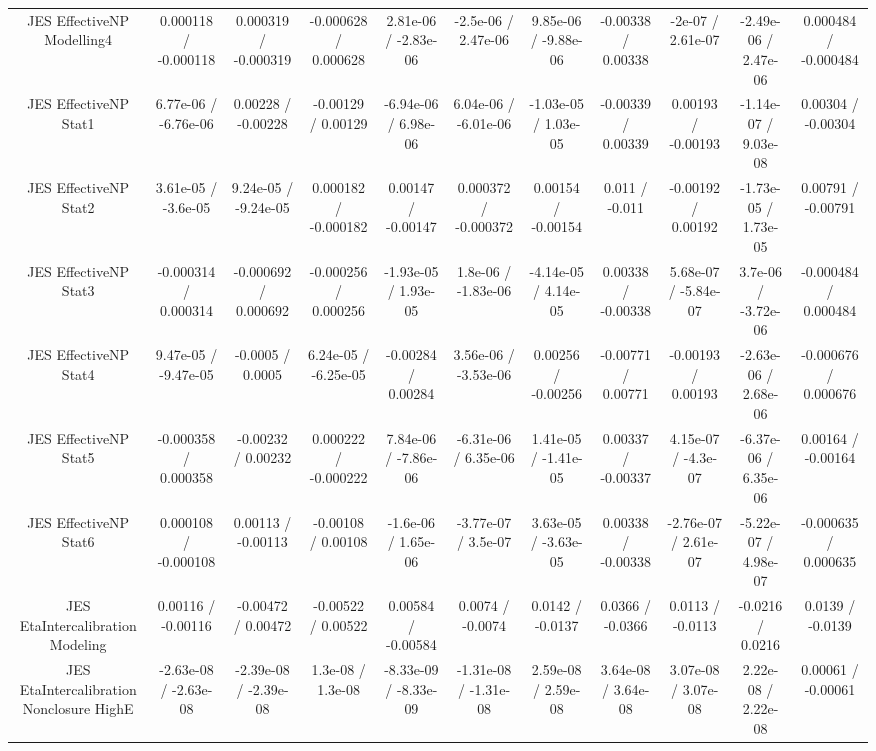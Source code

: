 \begin{table}[htbp]
\begin{center}
\begin{tabular}{|c|c|c|c|c|c|c|c|c|c|c|}
  JES EffectiveNP Modelling4 & 0.000118 / -0.000118 & 0.000319 / -0.000319 & -0.000628 / 0.000628 & 2.81e-06 / -2.83e-06 & -2.5e-06 / 2.47e-06 & 9.85e-06 / -9.88e-06 & -0.00338 / 0.00338 & -2e-07 / 2.61e-07 & -2.49e-06 / 2.47e-06 & 0.000484 / -0.000484 \\ 
  JES EffectiveNP Stat1 & 6.77e-06 / -6.76e-06 & 0.00228 / -0.00228 & -0.00129 / 0.00129 & -6.94e-06 / 6.98e-06 & 6.04e-06 / -6.01e-06 & -1.03e-05 / 1.03e-05 & -0.00339 / 0.00339 & 0.00193 / -0.00193 & -1.14e-07 / 9.03e-08 & 0.00304 / -0.00304 \\ 
  JES EffectiveNP Stat2 & 3.61e-05 / -3.6e-05 & 9.24e-05 / -9.24e-05 & 0.000182 / -0.000182 & 0.00147 / -0.00147 & 0.000372 / -0.000372 & 0.00154 / -0.00154 & 0.011 / -0.011 & -0.00192 / 0.00192 & -1.73e-05 / 1.73e-05 & 0.00791 / -0.00791 \\ 
  JES EffectiveNP Stat3 & -0.000314 / 0.000314 & -0.000692 / 0.000692 & -0.000256 / 0.000256 & -1.93e-05 / 1.93e-05 & 1.8e-06 / -1.83e-06 & -4.14e-05 / 4.14e-05 & 0.00338 / -0.00338 & 5.68e-07 / -5.84e-07 & 3.7e-06 / -3.72e-06 & -0.000484 / 0.000484 \\ 
  JES EffectiveNP Stat4 & 9.47e-05 / -9.47e-05 & -0.0005 / 0.0005 & 6.24e-05 / -6.25e-05 & -0.00284 / 0.00284 & 3.56e-06 / -3.53e-06 & 0.00256 / -0.00256 & -0.00771 / 0.00771 & -0.00193 / 0.00193 & -2.63e-06 / 2.68e-06 & -0.000676 / 0.000676 \\ 
  JES EffectiveNP Stat5 & -0.000358 / 0.000358 & -0.00232 / 0.00232 & 0.000222 / -0.000222 & 7.84e-06 / -7.86e-06 & -6.31e-06 / 6.35e-06 & 1.41e-05 / -1.41e-05 & 0.00337 / -0.00337 & 4.15e-07 / -4.3e-07 & -6.37e-06 / 6.35e-06 & 0.00164 / -0.00164 \\ 
  JES EffectiveNP Stat6 & 0.000108 / -0.000108 & 0.00113 / -0.00113 & -0.00108 / 0.00108 & -1.6e-06 / 1.65e-06 & -3.77e-07 / 3.5e-07 & 3.63e-05 / -3.63e-05 & 0.00338 / -0.00338 & -2.76e-07 / 2.61e-07 & -5.22e-07 / 4.98e-07 & -0.000635 / 0.000635 \\ 
  JES EtaIntercalibration Modeling & 0.00116 / -0.00116 & -0.00472 / 0.00472 & -0.00522 / 0.00522 & 0.00584 / -0.00584 & 0.0074 / -0.0074 & 0.0142 / -0.0137 & 0.0366 / -0.0366 & 0.0113 / -0.0113 & -0.0216 / 0.0216 & 0.0139 / -0.0139 \\ 
  JES EtaIntercalibration Nonclosure HighE & -2.63e-08 / -2.63e-08 & -2.39e-08 / -2.39e-08 & 1.3e-08 / 1.3e-08 & -8.33e-09 / -8.33e-09 & -1.31e-08 / -1.31e-08 & 2.59e-08 / 2.59e-08 & 3.64e-08 / 3.64e-08 & 3.07e-08 / 3.07e-08 & 2.22e-08 / 2.22e-08 & 0.00061 / -0.00061 \\ 

\end{tabular}
\end{center}
\end{table}
